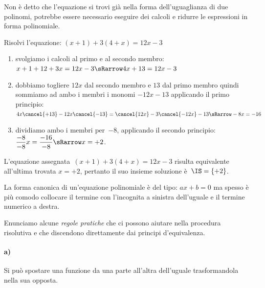 
Non è detto che l'equazione si trovi già nella forma dell'uguaglianza 
di due polinomi, potrebbe essere necessario eseguire dei calcoli e 
ridurre le espressioni in forma polinomiale.

\begin{esempio}{}{}
Risolvi l'equazione: \quad \((x +1) +3(4 +x) = 12x -3\)

\vspace{.5em}
\begin{enumerate}
\item svolgiamo i calcoli al primo e al secondo membro:\\
\(x+1+12+3x=12x-3 \sRarrow 4x+13=12x-3\)
\item dobbiamo togliere \(12x\) dal secondo membro e \(13\) dal primo 
membro quindi sommiamo ad ambo i membri i monomi \(-12x -13\)
applicando il primo principio:\\
\(4x\cancel{+13}-12x\cancel{-13}=\cancel{12x}-3\cancel{-12x}-13 \sRarrow 
-8x=-16\)
\item dividiamo ambo i membri per~\(-8\),
applicando il secondo principio:\\ 
\(\dfrac{-8}{-8}x = \dfrac{-16}{-8} \sRarrow x = +2\).
\end{enumerate}

L'equazione assegnata~\((x +1) +3(4 +x) = 12x -3\)
risulta equivalente all'ultima trovata \(x = +2\), pertanto il
suo insieme soluzione è~\(\IS = \{+2\}\).
\end{esempio}


\begin{osservazione}{}{} 
La forma canonica di un'equazione polinomiale è del tipo: \(ax +b = 0\)
ma spesso è più comodo collocare il termine con l'incognita a sinistra 
dell'uguale e il termine numerico a destra.
\end{osservazione}

Enunciamo alcune \emph{regole pratiche} 
che ci possono aiutare nella procedura risolutiva e che discendono 
direttamente dai principi d'equivalenza.

\paragraph{a)} 
Si può spostare una funzione da una parte all'altra dell'uguale
trasformandola nella sua opposta.

